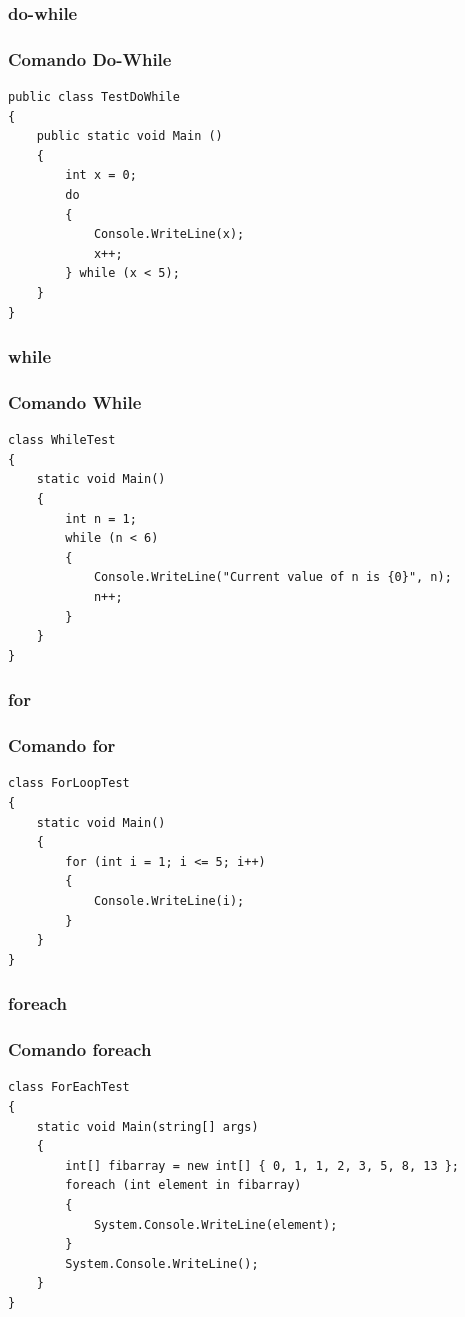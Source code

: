\documentclass{beamer}
\begin{document}
\subsubsection{do-while}
\begin{frame}[fragile]
\frametitle{Comando Do-While}
\begin{lstlisting}
public class TestDoWhile 
{
	public static void Main () 
	{
		int x = 0;
		do 
		{
			Console.WriteLine(x);
			x++;
		} while (x < 5);
	}
}
\end{lstlisting}
\end{frame}

\subsubsection{while}
\begin{frame}[fragile]
\frametitle{Comando While}
\begin{lstlisting}
class WhileTest 
{
	static void Main() 
	{
		int n = 1;
		while (n < 6) 
		{
			Console.WriteLine("Current value of n is {0}", n);
			n++;
		}
	}
}
\end{lstlisting}
\end{frame}

\subsubsection{for}
\begin{frame}[fragile]
\frametitle{Comando for}
\begin{lstlisting}
class ForLoopTest 
{
	static void Main() 
	{
		for (int i = 1; i <= 5; i++)
		{
			Console.WriteLine(i);
		}
	}
}
\end{lstlisting}
\end{frame}

\subsubsection{foreach}
\begin{frame}[fragile]
\frametitle{Comando foreach}
\begin{lstlisting}
class ForEachTest
{
	static void Main(string[] args)
	{
		int[] fibarray = new int[] { 0, 1, 1, 2, 3, 5, 8, 13 };
		foreach (int element in fibarray)
		{
			System.Console.WriteLine(element);
		}
		System.Console.WriteLine();
	}
}
\end{lstlisting}
\end{frame}

\end{document}

